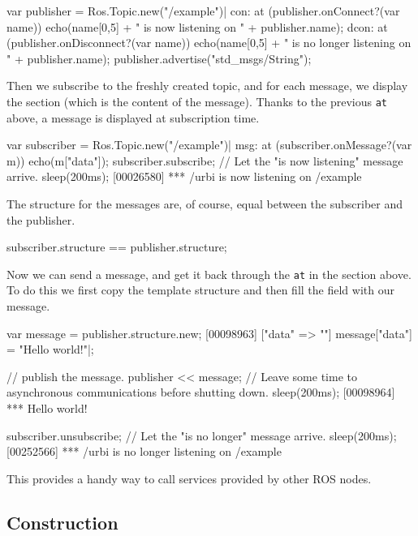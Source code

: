 \begin{urbiscript}
var publisher = Ros.Topic.new("/example")|
con: at (publisher.onConnect?(var name))
  echo(name[0,5] + " is now listening on " + publisher.name);
dcon: at (publisher.onDisconnect?(var name))
  echo(name[0,5] + " is no longer listening on " + publisher.name);
publisher.advertise("std_msgs/String");
\end{urbiscript}

Then we subscribe to the freshly created topic, and for each message, we
display the  section (which is the content of the
message). Thanks to the previous \lstinline{at} above, a message is
displayed at subscription time.

\begin{urbiscript}
var subscriber = Ros.Topic.new("/example")|
msg: at (subscriber.onMessage?(var m))
  echo(m["data"]);
subscriber.subscribe;
// Let the "is now listening" message arrive.
sleep(200ms);
[00026580] *** /urbi is now listening on /example
\end{urbiscript}

The structure for the messages are, of course, equal between the subscriber
and the publisher.

\begin{urbiassert}
subscriber.structure == publisher.structure;
\end{urbiassert}

Now we can send a message, and get it back through the \lstinline{at} in the
section above. To do this we first copy the template structure and then fill
the field  with our message.

\begin{urbiscript}
var message = publisher.structure.new;
[00098963] ["data" => ""]
message["data"] = "Hello world!"|;

// publish the message.
publisher << message;
// Leave some time to asynchronous communications before shutting down.
sleep(200ms);
[00098964] *** Hello world!

subscriber.unsubscribe;
// Let the "is no longer" message arrive.
sleep(200ms);
[00252566] *** /urbi is no longer listening on /example
\end{urbiscript}



This \UObject provides a handy way to call services provided by other ROS
nodes.


\subsection{Construction}

